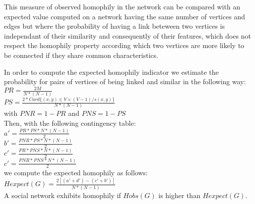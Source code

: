 This measure of observed homophily in the network can be compared with an expected value computed on a network having the same number of vertices and edges but where the probability of having a link beteween two vertices is independant of their similarity and consequently of their features, which does not respect the homophily property according which  two vertices are more  likely to be connected if they share common characteristics.

In order to compute the expected homophily indicator we estimate the probability for pairs of vertices of being linked and similar in the following way:\\
$PR = \frac{2M}{N*(N-1)}$\\
$PS = \frac{2*Card\{(x,y)\in V\times (V-1) / s(x,y)\}}{N*(N-1)}$\\
with $PNR = 1 - PR$ and $PNS = 1 - PS$\\

Then, with the following contingency table: \\
$a' = \frac{PR*PS*N*(N-1)}{2}$\\
$b' = \frac{PNR*PS*N*(N-1)}{2}$\\
$c' = \frac{PR*PNS*N*(N-1)}{2}$\\
$c' = \frac{PNR*PNS*N*(N-1)}{2}$\\
we compute the expected homophily as follows:\\
$Hexpect(G) = \frac{2[(a'+d')-(c'+b')]}{N*(N-1)}$\\

A social network exhibits homophily if $Hobs(G)$ is higher than $Hexpect(G)$.

